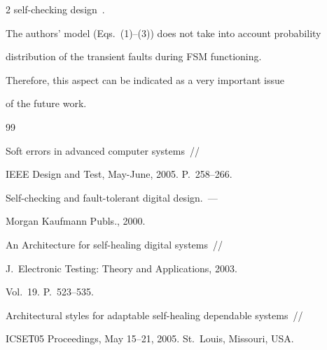 \begin{multicols}{2}
self-checking design~\cite{6fr}.

{



}





The authors' model (Eqs.~(1)--(3)) does not take into account probability

distribution of the transient faults during FSM functioning.

Therefore, this aspect can be indicated as a very important issue

of the future work.



{\small\frenchspacing

{%


\begin{thebibliography}{99}





Soft errors in advanced computer systems~//

IEEE Design and Test, May-June, 2005. P.~258--266.






Self-checking and fault-tolerant digital  design.~---

Morgan Kaufmann Publs., 2000.






An Architecture for self-healing digital systems~//

J.\ Electronic Testing: Theory and Applications, 2003.

Vol.~19. P.~523--535.






Architectural styles for adaptable self-healing dependable systems~//

ICSEТ05 Proceedings, May 15--21, 2005. St.\ Louis, Missouri, USA.




\end{thebibliography}}}
\end{multicols}
